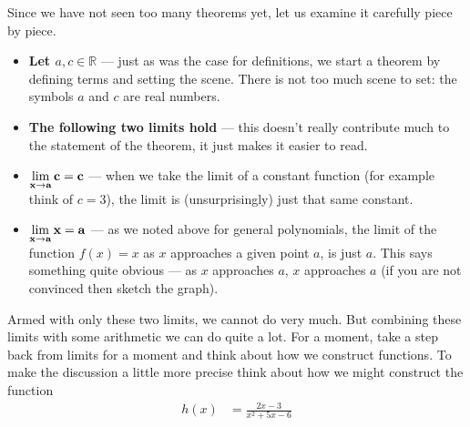 Since we have not seen too many theorems yet, let us examine it carefully piece
by piece.
\begin{itemize}
 \item \textbf{Let $a,c \in \mathbb{R}$} --- just as was the case for
definitions, we start a theorem by defining terms and setting the scene. There
is not too much scene to set: the symbols $a$ and $c$ are real numbers.
 \item \textbf{The following two limits hold} --- this doesn't really
contribute much to the statement of the theorem, it just makes it easier to
read.
 \item $\displaystyle \mathbf{\lim_{x \to a} c  = c}$  --- when we take the
limit of a
constant function (for example think of $c=3$), the limit is (unsurprisingly)
just that same constant.
 \item $\displaystyle \mathbf{\lim_{x \to a} x = a}$ --- as we noted above for general
polynomials, the limit of the function $f(x) = x$ as $x$ approaches a given
point $a$, is just $a$. This says something quite obvious --- as $x$ approaches
$a$, $x$ approaches $a$ (if you are not convinced then sketch the graph).
\end{itemize}


Armed with only these two limits, we cannot do very much. But combining these
limits with some arithmetic we can do quite a lot. For a moment, take a step
back from limits for a moment and think about how we construct functions. To
make the discussion a little more precise think about how we might construct
the function
\begin{align*}
  h(x) &= \frac{2x-3}{x^2+5x-6}
\end{align*}

